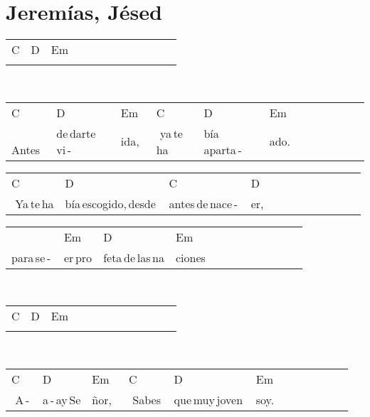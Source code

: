 \section*{Jeremías, Jésed\hfill}
\begin{multicols}{2}
\noindent
\begin{minipage}{\columnwidth}
\noindent
\noindent
\begin{tabular}{llllllllllll}
C&D&Em\\
\quad\quad\quad&\quad\quad\quad&
\end{tabular}
\end{minipage}\\

\noindent
\begin{minipage}{\columnwidth}
\noindent
\noindent
\begin{tabular}{llllllllllll}
C&D&Em&C&D&Em\\
\,\,Antes\,&de\,darte\,vi\,-\,&ida,\,\,\,&\,\,ya\,te\,ha&bía\,aparta\,-\,&ado.
\end{tabular}

\noindent
\begin{tabular}{llllllllllll}
C&D&C&D\\
\,\,Ya\,te\,ha&bía\,escogido,\,desde\,&antes\,de\,nace\,-\,&er,
\end{tabular}

\noindent
\begin{tabular}{llllllllllll}
&Em&D&Em\\
para\,se\,-\,&er\,pro&feta\,de\,las\,na&ciones
\end{tabular}
\end{minipage}\\

\noindent
\begin{minipage}{\columnwidth}
\noindent
\noindent
\begin{tabular}{llllllllllll}
C&D&Em\\
\quad\quad\quad&\quad\quad\quad&
\end{tabular}
\end{minipage}\\

\noindent
\begin{minipage}{\columnwidth}
\noindent
\noindent
\begin{tabular}{llllllllllll}
C&D&Em&C&D&Em\\
\,\,A\,-\,&a\,-\,ay\,Se&ñor,\,\,\,&\,\,Sabes\,&que\,muy\,joven\,&soy.
\end{tabular}


\end{minipage}
\end{multicols}
